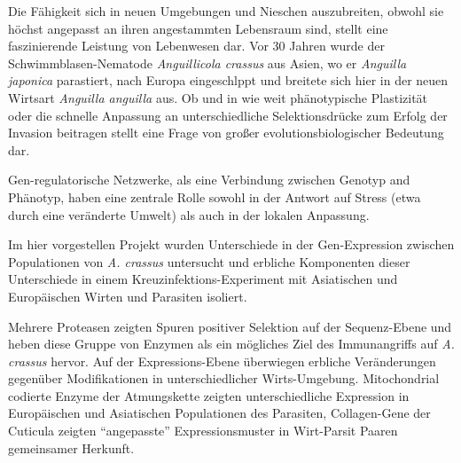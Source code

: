 

\begin{zusammenfassung}        %


  Die F\"ahigkeit sich in neuen Umgebungen und Nieschen auszubreiten,
  obwohl sie h\"ochst angepasst an ihren angestammten Lebensraum sind,
  stellt eine faszinierende Leistung von Lebenwesen dar. Vor 30 Jahren
  wurde der Schwimmblasen-Nematode \textit{Anguillicola crassus} aus
  Asien, wo er \textit{Anguilla japonica} parastiert, nach Europa
  eingeschlppt und breitete sich hier in der neuen Wirtsart
  \textit{Anguilla anguilla} aus. Ob und in wie weit ph\"anotypische
  Plastizit\"at oder die schnelle Anpassung an unterschiedliche
  Selektionsdr\"ucke zum Erfolg der Invasion beitragen stellt eine Frage
  von großer evolutionsbiologischer Bedeutung dar.

  Gen-regulatorische Netzwerke, als eine Verbindung zwischen Genotyp
  and Ph\"anotyp, haben eine zentrale Rolle sowohl in der Antwort auf
  Stress (etwa durch eine ver\"anderte Umwelt) als auch in der lokalen
  Anpassung.

  Im hier vorgestellen Projekt wurden Unterschiede in der
  Gen-Expression zwischen Populationen von \textit{A. crassus}
  untersucht und erbliche Komponenten dieser Unterschiede in einem
  Kreuzinfektions-Experiment mit Asiatischen und Europ\"aischen Wirten
  und Parasiten isoliert.

  Mehrere Proteasen zeigten Spuren positiver Selektion auf der
  Sequenz-Ebene und heben diese Gruppe von Enzymen als ein mögliches
  Ziel des Immunangriffs auf \textit{A. crassus} hervor. Auf der
  Expressions-Ebene \"uberwiegen erbliche Ver\"anderungen gegen\"uber
  Modifikationen in unterschiedlicher Wirts-Umgebung. Mitochondrial
  codierte Enzyme der Atmungskette zeigten unterschiedliche Expression
  in Europ\"aischen und Asiatischen Populationen des Parasiten,
  Collagen-Gene der Cuticula zeigten ``angepasste'' Expressionsmuster
  in Wirt-Parsit Paaren gemeinsamer Herkunft.


\end{zusammenfassung}





